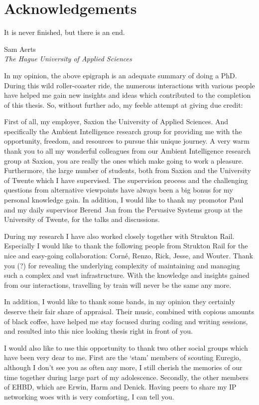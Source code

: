 \chapter{Acknowledgements}
\epigraph{It is never finished, but there is an end.}{Sam Aerts\\\textit{The Hague University of Applied Sciences}}

In my opinion, the above epigraph is an adequate summary of doing a PhD. During this wild roller-coaster ride, the numerous interactions with various people have helped me gain new insights and ideas which contributed to the completion of this thesis. So, without further ado, my feeble attempt at giving due credit:

First of all, my employer, Saxion the University of Applied Sciences. And specifically the Ambient Intelligence research group for providing me with the opportunity, freedom, and resources to pursue this unique journey. A very warm thank you to all my wonderful colleagues from our Ambient Intelligence research group at Saxion, you are really the ones which make going to work a pleasure. Furthermore, the large number of students, both from Saxion and the University of Twente which I have supervised. The supervision process and the challenging questions from alternative viewpoints have always been a big bonus for my personal knowledge gain. In addition, I would like to thank my promotor Paul and my daily supervisor Berend~Jan from the Pervasive Systems group at the University of Twente, for the talks and discussions.

During my research I have also worked closely together with Strukton Rail. Especially I would like to thank the following people from Strukton Rail for the nice and easy-going collaboration: Corn\'{e}, Renzo, Rick, Jesse, and Wouter. Thank you (?) for revealing the underlying complexity of maintaining and managing such a complex and vast infrastructure. With the knowledge and insights gained from our interactions, travelling by train will never be the same any more.

In addition, I would like to thank some bands\footnotemark, in my opinion they certainly deserve their fair share of appraisal. Their music, combined with copious amounts of black coffee, have helped me stay focused during coding and writing sessions, and resulted into this nice looking thesis right in front of you.

I would also like to use this opportunity to thank two other social groups which have been very dear to me. First are the `stam' members of scouting Euregio, although I don't see you as often any more, I still cherish the memories of our time together during large part of my adolescence. Secondly, the other members of EHBD, which are Erwin, Harm and Denick. Having peers to share my IP networking woes with is very comforting, I can tell you.

